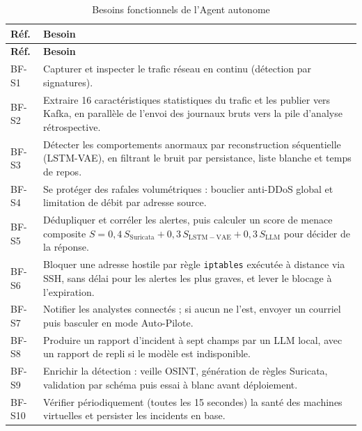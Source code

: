 \renewcommand{\arraystretch}{1.25}
\small
\begin{xltabular}{\textwidth}{|l|>{\raggedright\arraybackslash}X|}

\caption{Besoins fonctionnels de l'Agent autonome}
\label{tab:bf-agent} \\

\hline
{}
\textbf{Réf.} & \textbf{Besoin} \\ \hline
\endfirsthead

\hline
{}
\textbf{Réf.} & \textbf{Besoin} \\ \hline
\endhead

BF-S1 & Capturer et inspecter le trafic réseau en continu (détection par signatures). \\ \hline
BF-S2 & Extraire 16 caractéristiques statistiques du trafic et les publier vers Kafka, en parallèle de l'envoi des journaux bruts vers la pile d'analyse rétrospective. \\ \hline
BF-S3 & Détecter les comportements anormaux par reconstruction séquentielle (LSTM-VAE), en filtrant le bruit par persistance, liste blanche et temps de repos. \\ \hline
BF-S4 & Se protéger des rafales volumétriques : bouclier anti-DDoS global et limitation de débit par adresse source. \\ \hline
BF-S5 & Dédupliquer et corréler les alertes, puis calculer un score de menace composite $S = 0{,}4\,S_{\mathrm{Suricata}} + 0{,}3\,S_{\mathrm{LSTM-VAE}} + 0{,}3\,S_{\mathrm{LLM}}$ pour décider de la réponse. \\ \hline
BF-S6 & Bloquer une adresse hostile par règle \texttt{iptables} exécutée à distance via SSH, sans délai pour les alertes les plus graves, et lever le blocage à l'expiration. \\ \hline
BF-S7 & Notifier les analystes connectés ; si aucun ne l'est, envoyer un courriel puis basculer en mode Auto-Pilote. \\ \hline
BF-S8 & Produire un rapport d'incident à sept champs par un LLM local, avec un rapport de repli si le modèle est indisponible. \\ \hline
BF-S9 & Enrichir la détection : veille OSINT, génération de règles Suricata, validation par schéma puis essai à blanc avant déploiement. \\ \hline
BF-S10 & Vérifier périodiquement (toutes les 15 secondes) la santé des machines virtuelles et persister les incidents en base. \\ \hline

\end{xltabular}
